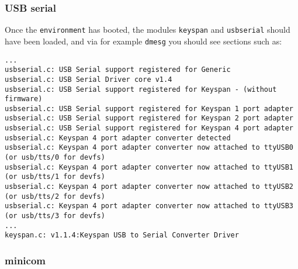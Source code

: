 \documentclass[11pt]{article}
\begin{document}
\subsubsection{USB serial}

Once the {\tt environment} has booted,  the modules
{\tt keyspan} and {\tt usbserial} should have been loaded, and via
for example {\tt dmesg} you should see sections such as:


\footnotesize
\begin{verbatim}
...
usbserial.c: USB Serial support registered for Generic
usbserial.c: USB Serial Driver core v1.4
usbserial.c: USB Serial support registered for Keyspan - (without firmware)
usbserial.c: USB Serial support registered for Keyspan 1 port adapter
usbserial.c: USB Serial support registered for Keyspan 2 port adapter
usbserial.c: USB Serial support registered for Keyspan 4 port adapter
usbserial.c: Keyspan 4 port adapter converter detected
usbserial.c: Keyspan 4 port adapter converter now attached to ttyUSB0 (or usb/tts/0 for devfs)
usbserial.c: Keyspan 4 port adapter converter now attached to ttyUSB1 (or usb/tts/1 for devfs)
usbserial.c: Keyspan 4 port adapter converter now attached to ttyUSB2 (or usb/tts/2 for devfs)
usbserial.c: Keyspan 4 port adapter converter now attached to ttyUSB3 (or usb/tts/3 for devfs)
...
keyspan.c: v1.1.4:Keyspan USB to Serial Converter Driver

\end{verbatim}
\footnotesize


\subsubsection{minicom}
\end{document}
